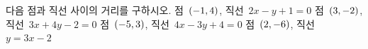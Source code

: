 다음 점과 직선 사이의 거리를 구하시오.
 점~$(-1{,}\mkern3mu\mathopen{}4)$, 직선~$2x-y+1=0$
 점~$(3{,}\mkern3mu\mathopen{}-2)$, 직선~$3x+4y-2=0$
 점~$(-5{,}\mkern3mu\mathopen{}3)$, 직선~$4x-3y+4=0$
 점~$(2{,}\mkern3mu\mathopen{}-6)$, 직선~$y=3x-2$

